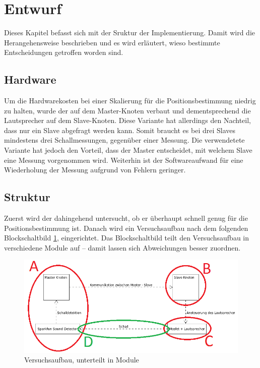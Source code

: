 \newpage
\section{Entwurf}
Dieses Kapitel befasst sich mit der Sruktur der Implementierung. Damit wird die Herangehensweise beschrieben und es wird erläutert, wieso bestimmte Entscheidungen getroffen worden sind.

\subsection{Hardware}
Um die Hardwarekosten bei einer Skalierung für die Positionsbestimmung niedrig zu halten, wurde der \microphone \platz auf dem Master-Knoten verbaut und dementsprechend die Lautsprecher auf dem Slave-Knoten. Diese Variante hat allerdings den Nachteil, dass nur ein Slave abgefragt werden kann. Somit braucht es bei drei Slaves mindestens drei Schallmessungen, gegenüber einer Messung. Die verwendetete Variante hat jedoch den Vorteil, dass der Master entscheidet, mit welchem Slave eine Messung vorgenommen wird. Weiterhin ist der Softwareaufwand für eine Wiederholung der Messung aufgrund von Fehlern geringer.

\subsection{Struktur}
Zuerst wird der \microphone \platz dahingehend untersucht, ob er überhaupt schnell genug für die Positionsbestimmung ist. Danach wird ein Versuchsaufbau nach dem folgenden Blockschaltbild \ref{img:kommunikation_module}, eingerichtet. Das Blockschaltbild teilt den Versuchsaufbau in verschiedene Module auf -- damit lassen sich Abweichungen besser zuordnen.

\begin{figure}[H]
	\centering
	\hspace*{-2.6cm}
	\includegraphics[width=1.3\textwidth]{images/Kommunikation_Module.png}
	\caption{Versuchsaufbau, unterteilt in Module}
	\label{img:kommunikation_module}
\end{figure}

